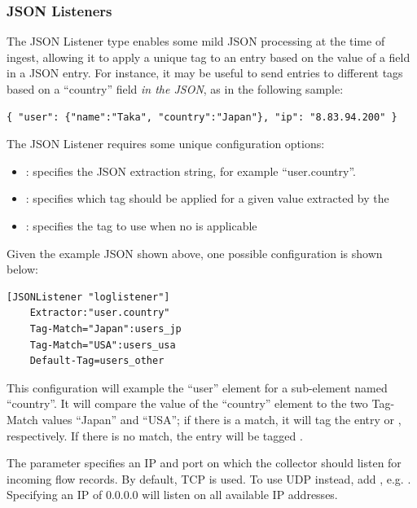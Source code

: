 \subsubsection*{JSON Listeners}

The JSON Listener type enables some mild JSON processing at the time of
ingest, allowing it to apply a unique tag to an entry based on the value
of a field in a JSON entry. For instance, it may be useful to send
entries to different tags based on a ``country'' field \emph{in the JSON},
as in the following sample:

\begin{Verbatim}[breaklines=true]
{ "user": {"name":"Taka", "country":"Japan"}, "ip": "8.83.94.200" }
\end{Verbatim}

The JSON Listener requires some unique configuration options:

\begin{itemize}
\item
  : specifies the JSON extraction string, for example
  ``user.country''.
\item
  : specifies which tag should be applied for a given value
  extracted by the 
\item
  : specifies the tag to use when no  is
  applicable
\end{itemize}

Given the example JSON shown above, one possible configuration is shown
below:

\begin{Verbatim}[breaklines=true]
[JSONListener "loglistener"]
    Extractor:"user.country"
    Tag-Match="Japan":users_jp
    Tag-Match="USA":users_usa
    Default-Tag=users_other
\end{Verbatim}

This configuration will example the ``user'' element for a sub-element
named ``country''. It will compare the value of the ``country''
element to the two Tag-Match values ``Japan'' and ``USA''; if there is a
match, it will tag the entry  or ,
respectively. If there is no match, the entry will be tagged
.

The  parameter specifies an IP and port on which
the collector should listen for incoming flow records. By default, TCP is used.
To use UDP instead, add , e.g. .
Specifying an IP of 0.0.0.0 will listen on all available IP addresses.

